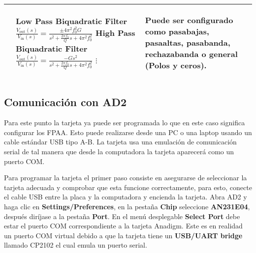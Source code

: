 \begin{table}[!ht]
\begin{tabular}{>{\centering\arraybackslash}m{3cm} >{\centering\arraybackslash}m{5cm} >{\centering\arraybackslash}m{5cm}}
	    &
	      \begin{scriptsize}
			 \textbf{Low Pass Biquadratic Filter} \linebreak
	      	 $\frac{V_{\mathrm{out}}(s)}{V_{\mathrm{in}}(s)} = \frac{\pm 4 \pi^{2} f_{0}^{2} G}{s^{2} + \frac{2 \pi f_{0}}{Q}s + 4 \pi^{2} f_{0}^{2}}$ \linebreak
	      	 \textbf{High Pass Biquadratic Filter} \linebreak
	      	 $\frac{V_{\mathrm{out}}(s)}{V_{\mathrm{in}}(s)} = \frac{-G s^{2}}{s^{2} + \frac{2 \pi f_{0}}{Q} s + 4 \pi^{2} f_{0}^{2}}$ \linebreak
	      	 $\vdots$
	      \end{scriptsize}
	    & 
	      \begin{itemize}[leftmargin=0cm,noitemsep]
	      \begin{scriptsize}
			\item[] Puede ser configurado como pasabajas, pasaaltas, pasabanda, rechazabanda o general (Polos y ceros).
	      \end{scriptsize}
	      \end{itemize}
	    \\ %
	    \hline
	  \end{tabular}
	\end{table}
	
		\subsection{Comunicación con AD2}

	Para este punto la tarjeta ya puede ser programada lo que en este caso significa configurar los FPAA. Esto puede realizarse desde una PC o una laptop usando un cable estándar USB tipo A-B. La tarjeta usa una emulación de comunicación serial de tal manera que desde la computadora la tarjeta aparecerá como un puerto COM.

	Para programar la tarjeta el primer paso consiste en asegurarse de seleccionar la tarjeta adecuada y comprobar que esta funcione correctamente, para esto, conecte el cable USB entre la placa y la computadora y encienda la tarjeta. Abra AD2 y haga clic en \textbf{Settings/Preferences}, en la pestaña \textbf{Chip} seleccione \textbf{AN231E04}, después diríjase a la pestaña \textbf{Port}. En el menú desplegable \textbf{Select Port} debe estar el puerto COM correspondiente a la tarjeta Anadigm. Este es en realidad un puerto COM virtual debido a que la tarjeta tiene un \textbf{USB/UART bridge} llamado CP2102 el cual emula un puerto serial. 

